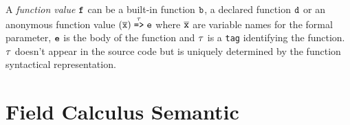 A \textit{function value} $\mathtt{f}$ can be a built-in function $\mathtt{b}$, a declared function $\mathtt{d}$ or an anonymous function value $(\overline{\mathtt{x}}) \stackrel{\tau}{\mathrm{\texttt{=>}}} \mathtt{e}$  where $\overline{\mathtt{x}}$ are variable names for the formal parameter, $\mathtt{e}$ is the body of the function and $\tau$ is a \texttt{tag} identifying the function. $\tau$ doesn't appear in the source code but is uniquely determined by the function syntactical representation.

\section{Field Calculus Semantic}

\begin{figure}[!t]{
 }
\end{figure}
